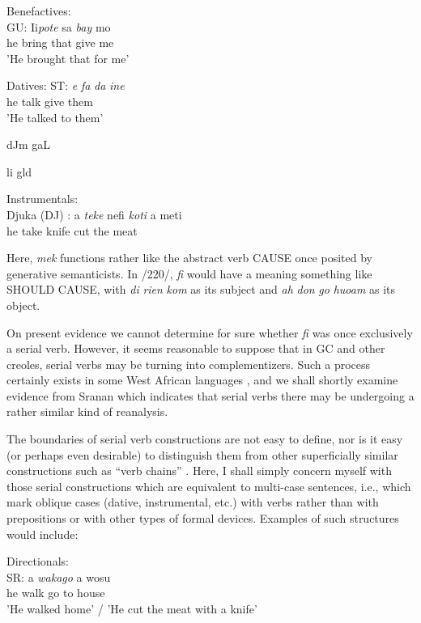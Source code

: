 \ea\label{ex:224}
 Benefactives:\\
\gll GU: Ii\textit{pote} sa \textit{bay} mo\\
he bring that give me\\
\glt 'He brought that for me'
\z

\ea\label{ex:225}
 Datives:
\gll  ST: \textit{e} \textit{fa} \textit{da} \textit{ine} \\
he talk give them \\
\glt 'He talked to them'
\z





dJm gaL

li gld

\ea\label{ex:226}
 Instrumentals:\\
\gll  Djuka (DJ) : a \textit{teke} nefi \textit{koti} a meti \\
he take knife cut the meat     \\
\z





Here, \textit{mek} functions rather like the abstract verb CAUSE once posited by generative semanticists. In /220/, \textit{fi} would have a meaning something
like SHOULD CAUSE, with \textit{di} \textit{rien} \textit{k}\textit{om} as its subject and \textit{ah} \textit{don} \textit{go} \textit{huoam} as its object.

On present evidence we cannot determine for sure whether \textit{fi}
was once exclusively a serial verb. However, it seems reasonable to suppose that in GC and other creoles, serial verbs may be turning into complementizers. Such a process certainly exists in some West African languages \citep{Lord1976}, and we shall shortly examine evidence from Sranan which indicates that serial verbs there may be undergoing a rather similar kind of reanalysis.

The boundaries of serial verb constructions are not easy to define, nor is it easy (or perhaps even desirable) to distinguish them from other superficially similar constructions such as ``verb chains'' \citep{Forman1972}. Here, I shall simply concern myself with those serial constructions which are equivalent to multi-case sentences, i.e., which mark oblique cases (dative, instrumental, etc.) with verbs rather than with prepositions or with other types of formal devices. Examples of such structures would include:

\ea\label{ex:223}
 Directionals:\\
\gll SR: a \textit{wak}\textit{a}\textit{go} a wosu\\
he walk go to house \\
\glt 'He walked home' / 'He cut the meat with a knife'
\z


